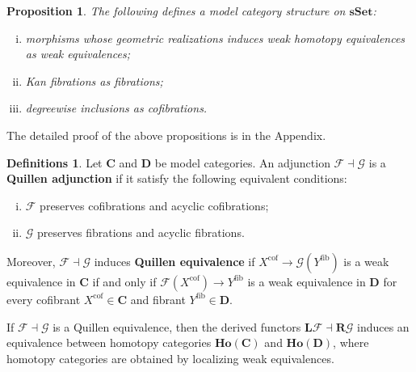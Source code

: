 \documentclass[psamsfonts]{amsart}
\newtheorem{prop}[thm]{Proposition}
\theoremstyle{definition}
\newtheorem{defns}[thm]{Definitions}
\theoremstyle{remark}
\newcommand{\Ho}{\mathbf{Ho}}
\newcommand{\sSet}{\mathbf{sSet}}
\numberwithin{equation}{section}
\begin{document}
\begin{prop}
The following defines a model category structure on $\sSet$:
\begin{enumerate}[(i)]
    \item morphisms whose geometric realizations induces weak homotopy equivalences as weak equivalences;
    \item Kan fibrations as fibrations;
    \item degreewise inclusions as cofibrations.
\end{enumerate}
\end{prop}

The detailed proof of the above propositions is in the Appendix.

\begin{defns}
Let $\mathbf{C}$ and $\mathbf{D}$ be model categories. An adjunction $\mathcal{F}\dashv\mathcal{G}$ is a \textbf{Quillen adjunction} if it satisfy the following equivalent conditions:\begin{enumerate}[(i)]
    \item $\mathcal{F}$ preserves cofibrations and acyclic cofibrations;
    \item $\mathcal{G}$ preserves fibrations and acyclic fibrations.
\end{enumerate}
Moreover, $\mathcal{F}\dashv\mathcal{G}$ induces \textbf{Quillen equivalence} if $X^{\textrm{cof}}\to\mathcal{G}(Y^{\textrm{fib}})$ is a weak equivalence in $\mathbf{C}$ if and only if $\mathcal{F}(X^{\textrm{cof}})\to Y^{\textrm{fib}}$ is a weak equivalence in $\mathbf{D}$ for every cofibrant $X^{\textrm{cof}}\in\mathbf{C}$ and fibrant $Y^{\textrm{fib}}\in\mathbf{D}$.
\end{defns}

If $\mathcal{F}\dashv\mathcal{G}$ is a Quillen equivalence, then the derived functors $\mathbf{L}\mathcal{F}\dashv\mathbf{R}\mathcal{G}$ induces an equivalence between homotopy categories $\Ho(\mathbf{C})$ and $\Ho(\mathbf{D})$, where homotopy categories are obtained by localizing weak equivalences.
\end{document}

